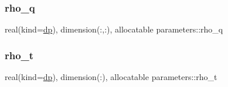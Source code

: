 \mbox{\label{group__DENSITIES_ga75b48fc89c0f01176fd8c58ced2979a8}} 
\subsubsection{\texorpdfstring{rho\+\_\+q}{rho\_q}}
{\footnotesize\ttfamily real(kind=\mbox{\hyperlink{namespaceparameters_a52f8c6351fd79345d8811e065bcbbb37}{dp}}), dimension(\+:,\+:), allocatable parameters\+::rho\+\_\+q}

\mbox{\label{group__DENSITIES_gacd0134e8939522696ec62e629c100fd9}} 
\subsubsection{\texorpdfstring{rho\+\_\+t}{rho\_t}}
{\footnotesize\ttfamily real(kind=\mbox{\hyperlink{namespaceparameters_a52f8c6351fd79345d8811e065bcbbb37}{dp}}), dimension(\+:), allocatable parameters\+::rho\+\_\+t}

